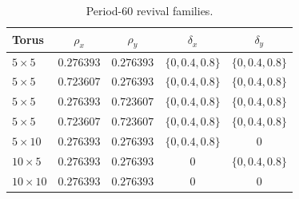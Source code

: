 \begin{table}[h]
\centering
\caption{Period-60 revival families.}
\label{tab:period60}
\begin{tabular}{lcccc}
\toprule
Torus & $\rho_x$ & $\rho_y$ & $\delta_x$ & $\delta_y$ \\
\midrule
$5\times5$   & $0.276393$ & $0.276393$ & $\{0,0.4,0.8\}$ & $\{0,0.4,0.8\}$ \\
$5\times5$   & $0.723607$ & $0.276393$ & $\{0,0.4,0.8\}$ & $\{0,0.4,0.8\}$ \\
$5\times5$   & $0.276393$ & $0.723607$ & $\{0,0.4,0.8\}$ & $\{0,0.4,0.8\}$ \\
$5\times5$   & $0.723607$ & $0.723607$ & $\{0,0.4,0.8\}$ & $\{0,0.4,0.8\}$ \\
$5\times10$  & $0.276393$ & $0.276393$ & $\{0,0.4,0.8\}$ & $0$ \\
$10\times5$  & $0.276393$ & $0.276393$ & $0$ & $\{0,0.4,0.8\}$ \\
$10\times10$ & $0.276393$ & $0.276393$ & $0$ & $0$ \\
\bottomrule
\end{tabular}
\end{table}
